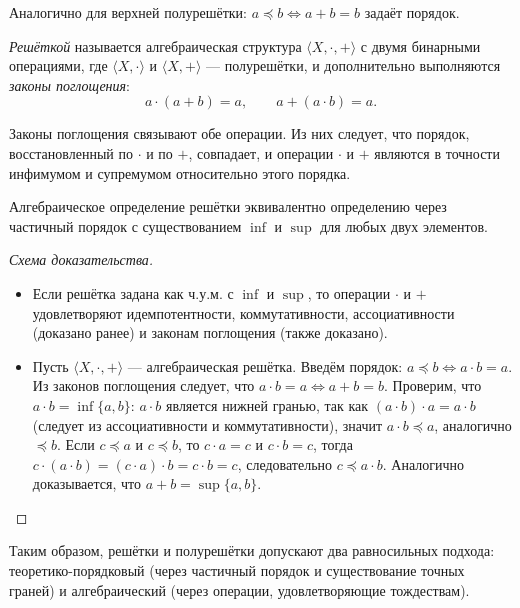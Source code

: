 \documentclass[10pt]{article}
\begin{document}
Аналогично для верхней полурешётки: $a \preceq b \iff a + b = b$ задаёт порядок.

\begin{definition}
\textit{Решёткой} называется алгебраическая структура $\langle X, \cdot, + \rangle$ с двумя бинарными операциями, где $\langle X, \cdot \rangle$ и $\langle X, + \rangle$ — полурешётки, и дополнительно выполняются \textit{законы поглощения}:
$$ a \cdot (a + b) = a, \qquad a + (a \cdot b) = a. $$
\end{definition}

Законы поглощения связывают обе операции. Из них следует, что порядок, восстановленный по $\cdot$ и по $+$, совпадает, и операции $\cdot$ и $+$ являются в точности инфимумом и супремумом относительно этого порядка.

\begin{theorem}
Алгебраическое определение решётки эквивалентно определению через частичный порядок с существованием $\inf$ и $\sup$ для любых двух элементов.
\end{theorem}
\begin{proof}[Схема доказательства]
\begin{itemize}
    \item[($\Rightarrow$)] Если решётка задана как ч.у.м. с $\inf$ и $\sup$, то операции $\cdot$ и $+$ удовлетворяют идемпотентности, коммутативности, ассоциативности (доказано ранее) и законам поглощения (также доказано).
    \item[($\Leftarrow$)] Пусть $\langle X, \cdot, + \rangle$ — алгебраическая решётка. Введём порядок: $a \preceq b \iff a \cdot b = a$. Из законов поглощения следует, что $a \cdot b = a \iff a + b = b$. Проверим, что $a \cdot b = \inf\{a,b\}$: $a\cdot b$ является нижней гранью, так как $(a\cdot b)\cdot a = a\cdot b$ (следует из ассоциативности и коммутативности), значит $a\cdot b \preceq a$, аналогично $\preceq b$. Если $c \preceq a$ и $c \preceq b$, то $c\cdot a = c$ и $c\cdot b = c$, тогда $c\cdot (a\cdot b) = (c\cdot a)\cdot b = c\cdot b = c$, следовательно $c \preceq a\cdot b$. Аналогично доказывается, что $a+b = \sup\{a,b\}$.
\end{itemize}
\end{proof}

Таким образом, решётки и полурешётки допускают два равносильных подхода: теоретико-порядковый (через частичный порядок и существование точных граней) и алгебраический (через операции, удовлетворяющие тождествам).
\end{document}
